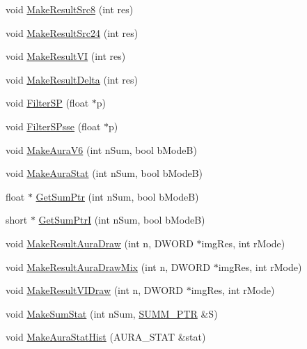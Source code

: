 \begin{DoxyCompactItemize}
\item 
void \hyperlink{class_c_v_i_engine_thread_a30b43140ec42578567286895a960cb4f}{Make\+Result\+Src8} (int res)
\item 
void \hyperlink{class_c_v_i_engine_thread_a3df2d213ef88168193cabc7a6bad8c6c}{Make\+Result\+Src24} (int res)
\item 
void \hyperlink{class_c_v_i_engine_thread_a02bac0a7df7e985164b867ea3433bb40}{Make\+Result\+V\+I} (int res)
\item 
void \hyperlink{class_c_v_i_engine_thread_ab6c4ea18d353a7dc00aa1698c379afde}{Make\+Result\+Delta} (int res)
\item 
void \hyperlink{class_c_v_i_engine_thread_a7e13a627c4b748b2a897e5cfb314f0a2}{Filter\+S\+P} (float $\ast$p)
\item 
void \hyperlink{class_c_v_i_engine_thread_a900848dc88ad3445296cbd72c467875c}{Filter\+S\+Psse} (float $\ast$p)
\item 
void \hyperlink{class_c_v_i_engine_thread_a138c31012cd6924325231acdd4fbba49}{Make\+Aura\+V6} (int n\+Sum, bool b\+Mode\+B)
\item 
void \hyperlink{class_c_v_i_engine_thread_a6194597cfb410aaa4a3b291f9dbe13cd}{Make\+Aura\+Stat} (int n\+Sum, bool b\+Mode\+B)
\item 
float $\ast$ \hyperlink{class_c_v_i_engine_thread_a157eaab33c9c5c2a157b458a4a0eb1f4}{Get\+Sum\+Ptr} (int n\+Sum, bool b\+Mode\+B)
\item 
short $\ast$ \hyperlink{class_c_v_i_engine_thread_ac9185cf585d0d141ccd42b7891020776}{Get\+Sum\+Ptr\+I} (int n\+Sum, bool b\+Mode\+B)
\item 
void \hyperlink{class_c_v_i_engine_thread_ae6cccc248ff3e63ee357ec6453f2ce4b}{Make\+Result\+Aura\+Draw} (int n, D\+W\+O\+R\+D $\ast$img\+Res, int r\+Mode)
\item 
void \hyperlink{class_c_v_i_engine_thread_a61e44ad37880d66e07855e751b67d9d3}{Make\+Result\+Aura\+Draw\+Mix} (int n, D\+W\+O\+R\+D $\ast$img\+Res, int r\+Mode)
\item 
void \hyperlink{class_c_v_i_engine_thread_abf2a40038d465ccb943072431774c6ae}{Make\+Result\+V\+I\+Draw} (int n, D\+W\+O\+R\+D $\ast$img\+Res, int r\+Mode)
\item 
void \hyperlink{class_c_v_i_engine_thread_a6e69080c6da14f8bb61c0615180bd088}{Make\+Sum\+Stat} (int n\+Sum, \hyperlink{struct_c_v_i_engine_thread_1_1tag_s_u_m_m___p_t_r}{S\+U\+M\+M\+\_\+\+P\+T\+R} \&S)
\item 
void \hyperlink{class_c_v_i_engine_thread_ac5a7ba8ea2d72478af174b471d73fd5c}{Make\+Aura\+Stat\+Hist} (A\+U\+R\+A\+\_\+\+S\+T\+A\+T \&stat)

\end{DoxyCompactItemize}
